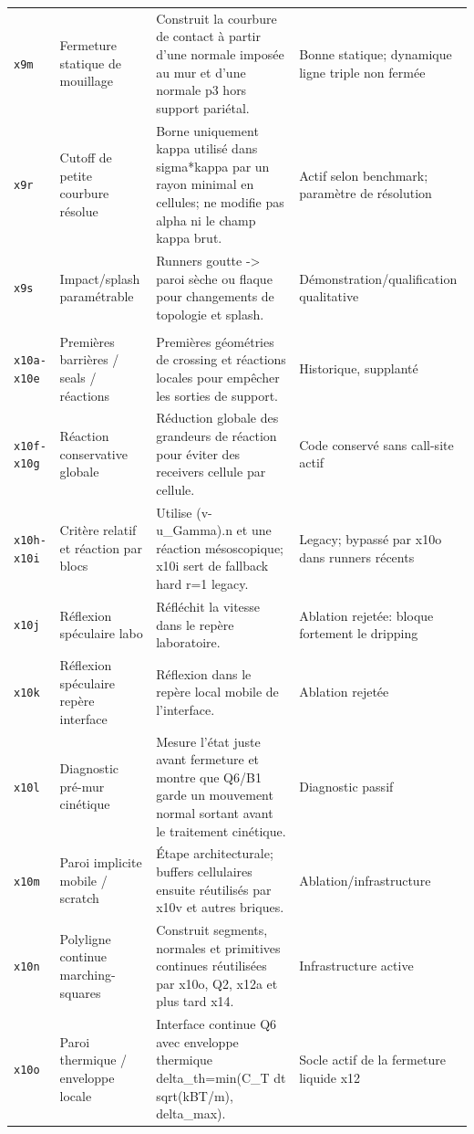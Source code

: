 \documentclass[a4paper,9pt]{article}
\begin{document}
\begin{landscape}
\begin{longtable}{L{2.35cm} L{5.3cm} L{13.25cm} L{4.75cm}}
\texttt{x9m} & Fermeture statique de mouillage & Construit la courbure de contact à partir d'une normale imposée au mur et d'une normale p3 hors support pariétal. & Bonne statique; dynamique ligne triple non fermée \\
\texttt{x9r} & Cutoff de petite courbure résolue & Borne uniquement kappa utilisé dans sigma*kappa par un rayon minimal en cellules; ne modifie pas alpha ni le champ kappa brut. & Actif selon benchmark; paramètre de résolution \\
\texttt{x9s} & Impact/splash paramétrable & Runners goutte -> paroi sèche ou flaque pour changements de topologie et splash. & Démonstration/qualification qualitative \\
\\
\texttt{x10a-x10e} & Premières barrières / seals / réactions & Premières géométries de crossing et réactions locales pour empêcher les sorties de support. & Historique, supplanté \\
\texttt{x10f-x10g} & Réaction conservative globale & Réduction globale des grandeurs de réaction pour éviter des receivers cellule par cellule. & Code conservé sans call-site actif \\
\texttt{x10h-x10i} & Critère relatif et réaction par blocs & Utilise (v-u\_Gamma).n et une réaction mésoscopique; x10i sert de fallback hard r=1 legacy. & Legacy; bypassé par x10o dans runners récents \\
\texttt{x10j} & Réflexion spéculaire labo & Réfléchit la vitesse dans le repère laboratoire. & Ablation rejetée: bloque fortement le dripping \\
\texttt{x10k} & Réflexion spéculaire repère interface & Réflexion dans le repère local mobile de l'interface. & Ablation rejetée \\
\texttt{x10l} & Diagnostic pré-mur cinétique & Mesure l'état juste avant fermeture et montre que Q6/B1 garde un mouvement normal sortant avant le traitement cinétique. & Diagnostic passif \\
\texttt{x10m} & Paroi implicite mobile / scratch & Étape architecturale; buffers cellulaires ensuite réutilisés par x10v et autres briques. & Ablation/infrastructure \\
\texttt{x10n} & Polyligne continue marching-squares & Construit segments, normales et primitives continues réutilisées par x10o, Q2, x12a et plus tard x14. & Infrastructure active \\
\texttt{x10o} & Paroi thermique / enveloppe locale & Interface continue Q6 avec enveloppe thermique delta\_th=min(C\_T dt sqrt(kBT/m), delta\_max). & Socle actif de la fermeture liquide x12 \\

\end{longtable}
\end{landscape}
\end{document}

